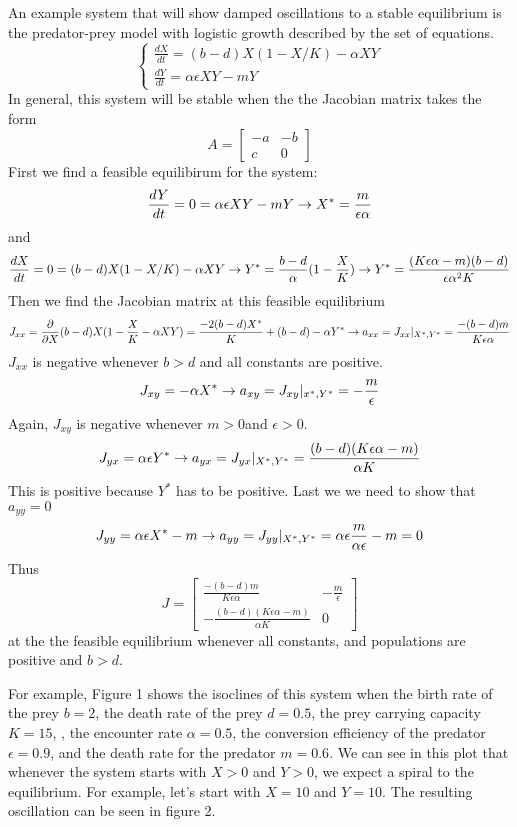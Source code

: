 \documentclass[
]{article}
\begin{document}
An example system that will show damped oscillations to a stable
equilibrium is the predator-prey model with logistic growth described by
the set of equations. \[
\begin{cases}
\frac{dX}{dt}=(b-d)X(1-X/K)-\alpha XY\\
\frac{dY}{dt}=\alpha\epsilon XY- mY
\end{cases}
\] In general, this system will be stable when the the Jacobian matrix
takes the form \[
A=\begin{bmatrix}
-a & -b\\
c & 0
\end{bmatrix}
\] First we find a feasible equilibirum for the system: \[
\frac{dY}{dt}=0=\alpha\epsilon XY- mY\\
\rightarrow X^*=\frac{m}{\epsilon\alpha}
\] and \[
\frac{dX}{dt}=0=(b-d)X(1-X/K)-\alpha XY \\
\rightarrow Y^*=\frac{b-d}{\alpha}(1-\frac{X}{K})\\
\rightarrow Y^*= \frac{(K\epsilon\alpha-m)(b-d)}{\epsilon\alpha^2K}
\] Then we find the Jacobian matrix at this feasible equilibrium \[
J_{xx}= \frac{\partial}{\partial X}(b-d)X(1-\frac{X}{K}-\alpha XY)\\
= \frac{-2(b-d)X^*}{K}+(b-d)-\alpha Y^*\\
\rightarrow a_{xx}=J_{xx}|_{X^*,Y^*}=\frac{-(b-d)m}{K\epsilon\alpha}\\
\] \(J_{xx}\) is negative whenever \(b>d\) and all constants are
positive. \[
J_{xy}=-\alpha X^*\\
\rightarrow a_{xy}=J_{xy}|_{x^*,Y^*}=-\frac{m}{\epsilon}
\] Again, \(J_{xy}\) is negative whenever \(m>0\)and \(\epsilon>0\). \[
J_{yx}=\alpha\epsilon Y^*\\
\rightarrow a_{yx}=J_{yx}|_{X^*,Y^*}= \frac{(b-d)(K\epsilon\alpha-m)}{\alpha K}
\] This is positive because \(Y^*\) has to be positive. Last we we need
to show that \(a_{yy}=0\) \[
J_{yy}=\alpha\epsilon X^*-m\\
\rightarrow a_{yy}=J_{yy}|_{X^*,Y^*}=\alpha\epsilon \frac{m}{\alpha\epsilon}-m=0
\] Thus \[ 
J= \begin{bmatrix}\frac{-(b-d)m}{K\epsilon\alpha} & -\frac{m}{\epsilon}\\-\frac{(b-d)(K\epsilon\alpha-m)}{\alpha K} & 0\end{bmatrix}
\] at the the feasible equilibrium whenever all constants, and
populations are positive and \(b>d\).

For example, Figure 1 shows the isoclines of this system when the birth
rate of the prey \(b=2\), the death rate of the prey \(d=0.5\), the prey
carrying capacity \(K=15\), , the encounter rate \(\alpha=0.5\), the
conversion efficiency of the predator \(\epsilon=0.9\), and the death
rate for the predator \(m=0.6\). We can see in this plot that whenever
the system starts with \(X>0\) and \(Y>0\), we expect a spiral to the
equilibrium. For example, let's start with \(X=10\) and \(Y=10\). The
resulting oscillation can be seen in figure 2.
\end{document}
